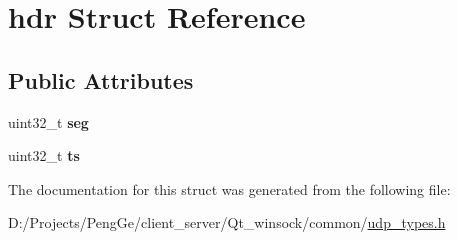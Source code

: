 \hypertarget{structhdr}{}\section{hdr Struct Reference}
\label{structhdr}
\subsection*{Public Attributes}
\begin{DoxyCompactItemize}
\item 
\hypertarget{structhdr_a0fe6fdc43d5884531407540c317cc29a}{}uint32\+\_\+t {\bfseries seg}\label{structhdr_a0fe6fdc43d5884531407540c317cc29a}

\item 
\hypertarget{structhdr_a0902aeb74b0763203be1c07c2cbc10da}{}uint32\+\_\+t {\bfseries ts}\label{structhdr_a0902aeb74b0763203be1c07c2cbc10da}

\end{DoxyCompactItemize}


The documentation for this struct was generated from the following file\+:\begin{DoxyCompactItemize}
\item 
D\+:/\+Projects/\+Peng\+Ge/client\+\_\+server/\+Qt\+\_\+winsock/common/\hyperlink{udp__types_8h}{udp\+\_\+types.\+h}\end{DoxyCompactItemize}
